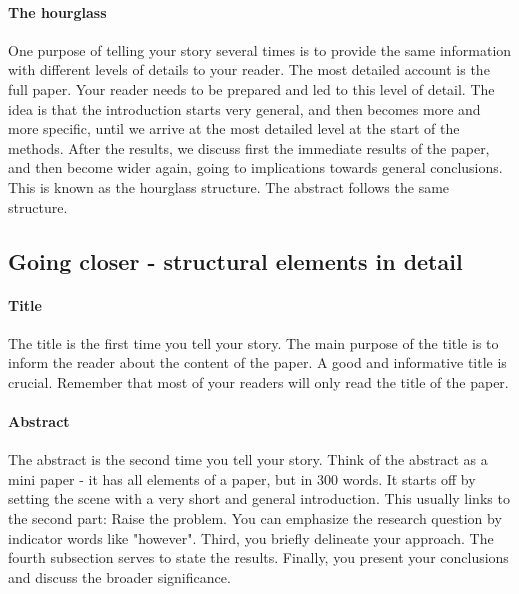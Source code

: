 \documentclass{tufte-book}
\begin{document}
\paragraph{The hourglass} One purpose of telling your story several times is to provide the same information with different levels of details to your reader. The most detailed account is the full paper. Your reader needs to be prepared and led to this level of detail. The idea is that the introduction starts very general, and then becomes more and more specific, until we arrive at the most detailed level at the start of the methods. After the results, we discuss first the immediate results of the paper, and then become wider again, going to implications towards general conclusions. This is known as the hourglass structure. The abstract follows the same structure. 
 
\subsection{Going closer - structural elements in detail}

\paragraph{Title} The title is the first time you tell your story. The main purpose of the title is to inform the reader about the content of the paper. A good and informative title is crucial. Remember that most of your readers will only read the title of the paper.

\paragraph{Abstract}The abstract is the second time you tell your story. Think of the abstract as a mini paper - it has all elements of a paper, but in 300 words. It starts off by setting the scene with a very short and general introduction. This usually links to the second part: Raise the problem. You can emphasize the research question by indicator words like "however". Third, you briefly delineate your approach. The fourth subsection serves to state the results. Finally, you present your conclusions and discuss the broader significance.\\
\end{document}
